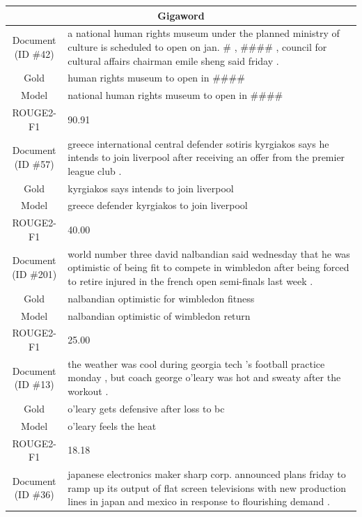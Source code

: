 \begin{table}[bth!]
\scriptsize
\centering
\renewcommand{\arraystretch}{1.3}
\begin{tabular}{c|p{}}
\hline
\multicolumn{2}{c}{Gigaword} \\ \hline
\makecell{Document\\(ID \#42)} & 
a national human rights museum under the planned ministry of culture is scheduled to open on jan. \# , \#\#\#\# , council for cultural affairs chairman emile sheng said friday .
\\ \hline
Gold & 
human rights museum to open in \#\#\#\#
\\ \hline
Model & 
national human rights museum to open in \#\#\#\#
\\ \hline
ROUGE2-F1 & 
90.91
\\ \hline
\makecell{Document\\(ID \#57)} & 
greece international central defender sotiris kyrgiakos says he intends to join liverpool after receiving an offer from the premier league club .
\\ \hline
Gold & 
kyrgiakos says intends to join liverpool
\\ \hline
Model & 
greece defender kyrgiakos to join liverpool
\\ \hline
ROUGE2-F1 & 
40.00
\\ \hline
\makecell{Document\\(ID \#201)} & 
world number three david nalbandian said wednesday that he was optimistic of being fit to compete in wimbledon after being forced to retire injured in the french open semi-finals last week .
\\ \hline
Gold & 
nalbandian optimistic for wimbledon fitness
\\ \hline
Model & 
nalbandian optimistic of wimbledon return
\\ \hline
ROUGE2-F1 & 
25.00
\\ \hline
\makecell{Document\\(ID \#13)} & 
the weather was cool during georgia tech 's football practice monday , but coach george o'leary was hot and sweaty after the workout .
\\ \hline
Gold & 
o'leary gets defensive after loss to bc
\\ \hline
Model & 
o'leary feels the heat
\\ \hline
ROUGE2-F1 & 
18.18
\\ \hline
\makecell{Document\\(ID \#36)} & 
japanese electronics maker sharp corp. announced plans friday to ramp up its output of flat screen televisions with new production lines in japan and mexico in response to flourishing demand .

\end{tabular}
\end{table}
